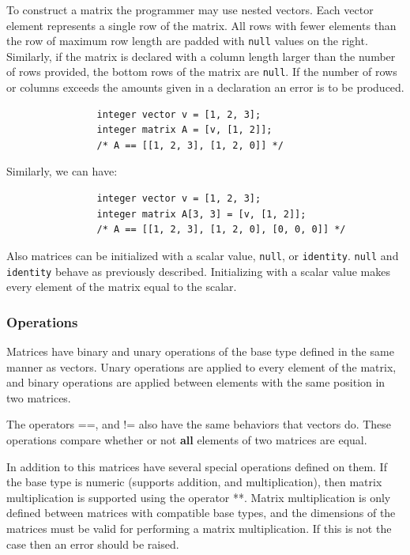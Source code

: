 \documentclass{article}
\begin{document}
			To construct a matrix the programmer may use nested vectors. Each vector element represents a single row of
			the matrix. All rows with fewer elements than the row of maximum row length are padded with \texttt{null}
			values on the right. Similarly, if the matrix is declared with a column length larger than the number of
			rows provided, the bottom rows of the matrix are \texttt{null}.  If the number of rows or columns exceeds
			the amounts given in a declaration an error is to be produced.

			\begin{lstlisting}
				integer vector v = [1, 2, 3];
				integer matrix A = [v, [1, 2]];
				/* A == [[1, 2, 3], [1, 2, 0]] */
			\end{lstlisting}

			Similarly, we can have:

			\begin{lstlisting}
				integer vector v = [1, 2, 3];
				integer matrix A[3, 3] = [v, [1, 2]];
				/* A == [[1, 2, 3], [1, 2, 0], [0, 0, 0]] */
			\end{lstlisting}

			Also matrices can be initialized with a scalar value, \texttt{null}, or \texttt{identity}. \texttt{null} and
			\texttt{identity} behave as previously described. Initializing with a scalar value makes every element of
			the matrix equal to the scalar.

		\subsubsection{Operations}

			Matrices have binary and unary operations of the base type defined in the same manner as vectors. Unary
			operations are applied to every element of the matrix, and binary operations are applied between elements
			with the same position in two matrices.

			The operators ==, and != also have the same behaviors that vectors do. These operations compare whether or
			not \textbf{all} elements of two matrices are equal.

			In addition to this matrices have several special operations defined on them.  If the base type is numeric
			(supports addition, and multiplication), then matrix multiplication is supported using the operator **.
			Matrix multiplication is only defined between matrices with compatible base types, and the dimensions of the
			matrices must be valid for performing a matrix multiplication. If this is not the case then an error should
			be raised.
\end{document}
